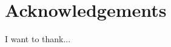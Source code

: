 \documentclass[../thesis/thesis.tex]{subfiles}
\begin{document}
\chapter*{Acknowledgements}
I want to thank...

\newpage
\tableofcontents
{}

\newpage
{}
\listoffigures
\newpage
{}
\listoftables

\end{document}
